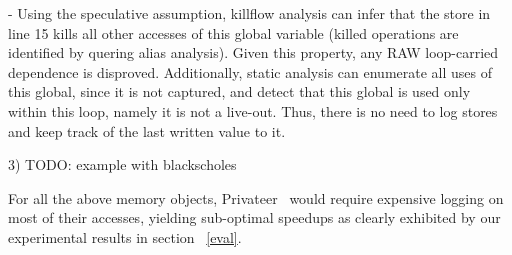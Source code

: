 - Using the speculative assumption, killflow analysis can infer that the store
  in line 15 kills all other accesses of this global
variable (killed operations are identified by quering alias analysis). Given this
property, any RAW loop-carried dependence is disproved.  Additionally, static
analysis can enumerate all uses of this global, since it is not captured, and
detect that this global is used only within this loop, namely it is not a
live-out.  Thus, there is no need to log stores and keep track of the last
written value to it.

3) TODO: example with blackscholes

For all the above memory objects, Privateer~\cite{} would require expensive
logging on most of their accesses,
yielding sub-optimal speedups as clearly
exhibited by our experimental results in section ~\ref{eval}.







